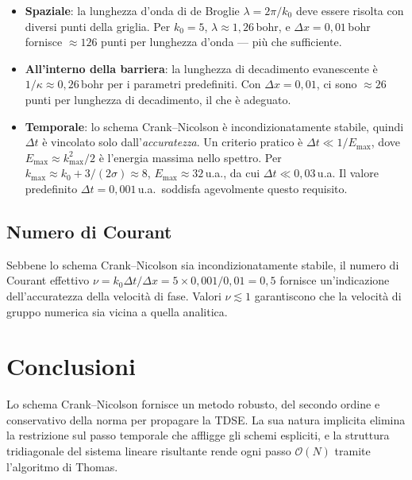 \documentclass[12pt, a4paper]{article}
\newcommand{\dt}{\Delta t}
\newcommand{\dx}{\Delta x}
\newcommand{\CN}{Crank--Nicolson}
\begin{document}
\begin{itemize}
  \item \textbf{Spaziale}: la lunghezza d'onda di de Broglie
        $\lambda = 2\pi/k_0$ deve essere risolta con diversi punti
        della griglia.  Per $k_0 = 5$, $\lambda \approx 1{,}26$\,bohr,
        e $\dx = 0{,}01$\,bohr fornisce $\approx 126$ punti per
        lunghezza d'onda --- più che sufficiente.

  \item \textbf{All'interno della barriera}: la lunghezza di decadimento
        evanescente è $1/\kappa \approx 0{,}26$\,bohr per i parametri
        predefiniti.  Con $\dx = 0{,}01$, ci sono $\approx 26$ punti per
        lunghezza di decadimento, il che è adeguato.

  \item \textbf{Temporale}: lo schema \CN{} è incondizionatamente
        stabile, quindi $\dt$ è vincolato solo dall'\emph{accuratezza}.
        Un criterio pratico è $\dt \ll 1/E_\text{max}$, dove
        $E_\text{max} \approx k_\text{max}^2/2$ è l'energia massima
        nello spettro.  Per $k_\text{max} \approx k_0 + 3/(2\sigma)
        \approx 8$, $E_\text{max} \approx 32$\,u.a., da cui
        $\dt \ll 0{,}03$\,u.a.  Il valore predefinito $\dt = 0{,}001$\,u.a.\
        soddisfa agevolmente questo requisito.
\end{itemize}

\subsection{Numero di Courant}

Sebbene lo schema \CN{} sia incondizionatamente stabile, il numero
di Courant effettivo $\nu = k_0\dt/\dx = 5 \times 0{,}001 / 0{,}01 = 0{,}5$
fornisce un'indicazione dell'accuratezza della velocità di fase.
Valori $\nu \lesssim 1$ garantiscono che la velocità di gruppo
numerica sia vicina a quella analitica.

\section{Conclusioni}

Lo schema \CN{} fornisce un metodo robusto, del secondo ordine e
conservativo della norma per propagare la TDSE.  La sua natura
implicita elimina la restrizione sul passo temporale che affligge gli
schemi espliciti, e la struttura tridiagonale del sistema lineare
risultante rende ogni passo $\mathcal{O}(N)$ tramite l'algoritmo di
Thomas.
\end{document}
